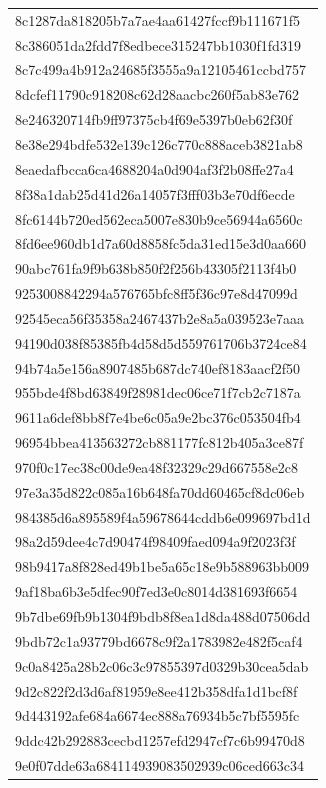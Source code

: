 \begin{tabular}{l}
8c1287da818205b7a7ae4aa61427fccf9b111671f5 \\
8c386051da2fdd7f8edbece315247bb1030f1fd319 \\
8c7c499a4b912a24685f3555a9a12105461ccbd757 \\
8dcfef11790c918208c62d28aacbc260f5ab83e762 \\
8e246320714fb9ff97375cb4f69e5397b0eb62f30f \\
8e38e294bdfe532e139c126c770c888aceb3821ab8 \\
8eaedafbcca6ca4688204a0d904af3f2b08ffe27a4 \\
8f38a1dab25d41d26a14057f3fff03b3e70df6ecde \\
8fc6144b720ed562eca5007e830b9ce56944a6560c \\
8fd6ee960db1d7a60d8858fc5da31ed15e3d0aa660 \\
90abc761fa9f9b638b850f2f256b43305f2113f4b0 \\
9253008842294a576765bfc8ff5f36c97e8d47099d \\
92545eca56f35358a2467437b2e8a5a039523e7aaa \\
94190d038f85385fb4d58d5d559761706b3724ce84 \\
94b74a5e156a8907485b687dc740ef8183aacf2f50 \\
955bde4f8bd63849f28981dec06ce71f7cb2c7187a \\
9611a6def8bb8f7e4be6c05a9e2bc376c053504fb4 \\
96954bbea413563272cb881177fc812b405a3ce87f \\
970f0c17ec38c00de9ea48f32329c29d667558e2c8 \\
97e3a35d822c085a16b648fa70dd60465cf8dc06eb \\
984385d6a895589f4a59678644cddb6e099697bd1d \\
98a2d59dee4c7d90474f98409faed094a9f2023f3f \\
98b9417a8f828ed49b1be5a65c18e9b588963bb009 \\
9af18ba6b3e5dfec90f7ed3e0c8014d381693f6654 \\
9b7dbe69fb9b1304f9bdb8f8ea1d8da488d07506dd \\
9bdb72c1a93779bd6678c9f2a1783982e482f5caf4 \\
9c0a8425a28b2c06c3c97855397d0329b30cea5dab \\
9d2c822f2d3d6af81959e8ee412b358dfa1d1bcf8f \\
9d443192afe684a6674ec888a76934b5c7bf5595fc \\
9ddc42b292883cecbd1257efd2947cf7c6b99470d8 \\
9e0f07dde63a684114939083502939c06ced663c34 \\

\end{tabular}
